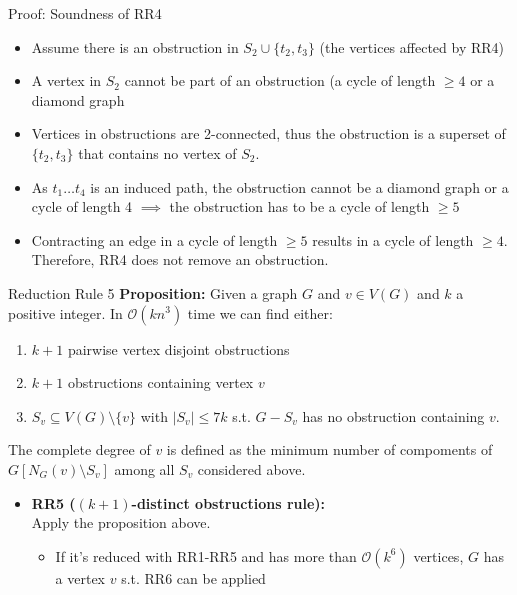 \documentclass{beamer}
\begin{document}
\begin{frame}{Proof: Soundness of RR4}
    \begin{itemize}[<+->]
        \item Assume there is an obstruction in \(S_2 \cup \{t_2,t_3\}\) (the vertices affected by RR4)
        \item A vertex in \(S_2\) cannot be part of an obstruction (a cycle of length \(\geq 4\) or a diamond graph 
        \item Vertices in obstructions are 2-connected, thus the obstruction is a superset of \(\{t_2,t_3\}\) that contains no vertex of \(S_2\).
        \item As \(t_1\ldots t_4\) is an induced path, the obstruction cannot be a diamond graph or a cycle of length 4 $\implies$ the obstruction has to be a cycle of length \(\geq 5\)
        \item Contracting an edge in a cycle of length \(\geq 5\) results in a cycle of length \(\geq 4\). Therefore, RR4 does not remove an obstruction.
    \end{itemize}
\end{frame}
\begin{frame}{Reduction Rule 5}
\textbf{Proposition:} Given a graph $G$ and $v\in V(G)$ and $k$ a positive integer. In $\mathcal O(kn^3)$ time we can find either:
\vspace{-5pt}
\begin{enumerate}
\item $k+1$ pairwise vertex disjoint obstructions
\item $k+1$ obstructions containing vertex $v$
\item $S_v\subseteq V(G)\setminus\{v\}$ with $|S_v| \leq 7k$ s.t. $G- S_v$ has no obstruction containing $v$.
\end{enumerate}
The complete degree of $v$ is defined as the minimum number of compoments of $G[N_G(v)\setminus S_v]$ among all $S_v$ considered above.
\begin{itemize}
    \item<2-> \textbf{RR5 ($(k+1)$-distinct obstructions rule):}\\
    Apply the proposition above. 
    \begin{itemize}
        \item<3-> If it's reduced with RR1-RR5 and has more than $\mathcal O(k^6)$ vertices, $G$ has a vertex $v$ s.t. RR6 can be applied
    \end{itemize}
\end{itemize}
\end{frame}
\end{document}

